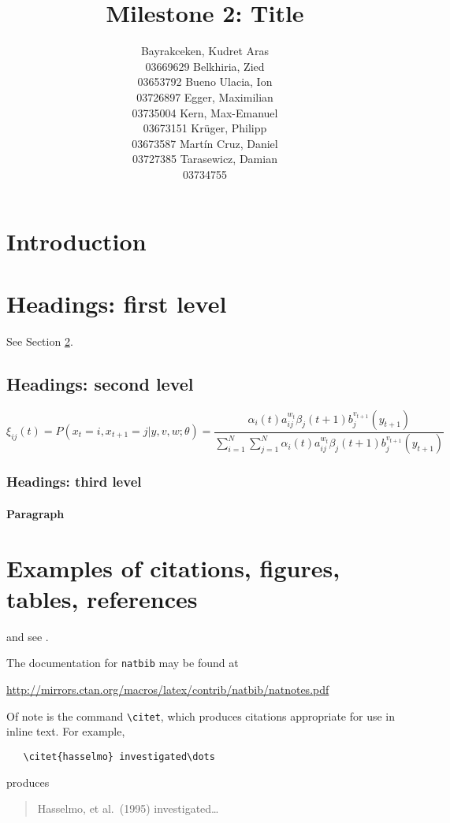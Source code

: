 \documentclass{article}
\title{Milestone 2: Title}
\author{Bayrakceken, Kudret Aras\\
	03669629
	\And
	Belkhiria, Zied\\
	03653792
	\And
	Bueno Ulacia, Ion\\
	03726897
	\And
	Egger, Maximilian\\
	03735004
	\And
	Kern, Max-Emanuel\\
	03673151
	\And
	Krüger, Philipp \\
	03673587
	\And
	Martín Cruz, Daniel\\
	03727385
	\And
	Tarasewicz, Damian\\
	03734755
}
\begin{document}
\maketitle

\begin{abstract}
	\lipsum[1]
\end{abstract}




\section{Introduction}
\lipsum[2]
\lipsum[3]


\section{Headings: first level}
\label{sec:headings}

\lipsum[4] See Section \ref{sec:headings}.

\subsection{Headings: second level}
\lipsum[5]
\begin{equation}
	\xi _{ij}(t)=P(x_{t}=i,x_{t+1}=j|y,v,w;\theta)= {\frac {\alpha _{i}(t)a^{w_t}_{ij}\beta _{j}(t+1)b^{v_{t+1}}_{j}(y_{t+1})}{\sum _{i=1}^{N} \sum _{j=1}^{N} \alpha _{i}(t)a^{w_t}_{ij}\beta _{j}(t+1)b^{v_{t+1}}_{j}(y_{t+1})}}
\end{equation}

\subsubsection{Headings: third level}
\lipsum[6]

\paragraph{Paragraph}
\lipsum[7]

\section{Examples of citations, figures, tables, references}
\label{sec:others}
\lipsum[8] \cite{kour2014real,kour2014fast} and see \cite{hadash2018estimate}.

The documentation for \verb+natbib+ may be found at
\begin{center}
	\url{http://mirrors.ctan.org/macros/latex/contrib/natbib/natnotes.pdf}
\end{center}
Of note is the command \verb+\citet+, which produces citations
appropriate for use in inline text.  For example,
\begin{verbatim}
   \citet{hasselmo} investigated\dots
\end{verbatim}
produces
\begin{quote}
	Hasselmo, et al.\ (1995) investigated\dots
\end{quote}
\end{document}
